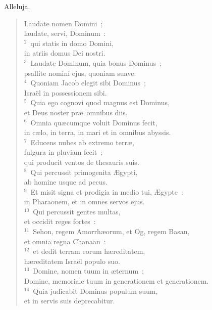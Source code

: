 \bchapter
\lettrine[lines=3,image=true,loversize=0.05,lraise=-0.03]{A}{}lleluja. \begin{flushleft}\begin{verse}\vspace{6pt}Laudate nomen Domini~;\\ laudate, servi, Dominum~:\\
${}^{2}$~qui statis in domo Domini,\\ in atriis domus Dei nostri.\\
${}^{3}$~Laudate Dominum, quia bonus Dominus~;\\ psallite nomini ejus, quoniam suave.\\
${}^{4}$~Quoniam Jacob elegit sibi Dominus~;\\ Isra\"el in possessionem sibi.\\
${}^{5}$~Quia ego cognovi quod magnus est Dominus,\\ et Deus noster pr\ae\ omnibus diis.\\
${}^{6}$~Omnia qu\ae cumque voluit Dominus fecit,\\ in c\ae lo, in terra, in mari et in omnibus abyssis.\\
${}^{7}$~Educens nubes ab extremo terr\ae ,\\ fulgura in pluviam fecit~;\\ qui producit ventos de thesauris suis.\\
${}^{8}$~Qui percussit primogenita \AE gypti,\\ ab homine usque ad pecus.\\
${}^{9}$~Et misit signa et prodigia in medio tui, \AE gypte~:\\ in Pharaonem, et in omnes servos ejus.\\
${}^{10}$~Qui percussit gentes multas,\\ et occidit reges fortes~:\\
${}^{11}$~Sehon, regem Amorrh\ae orum, et Og, regem Basan,\\ et omnia regna Chanaan~:\\
${}^{12}$~et dedit terram eorum h\ae reditatem,\\ h\ae reditatem Isra\"el populo suo.\\
${}^{13}$~Domine, nomen tuum in \ae ternum~;\\ Domine, memoriale tuum in generationem et generationem.\\
${}^{14}$~Quia judicabit Dominus populum suum,\\ et in servis suis deprecabitur.\\

\end{verse}
\end{flushleft}
